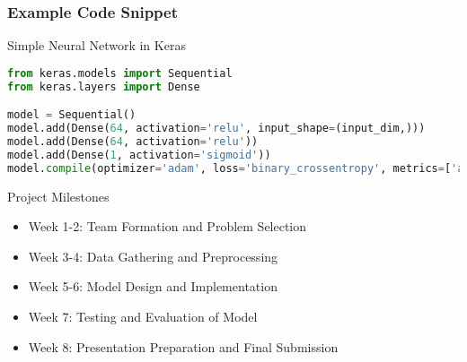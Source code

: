 \documentclass[aspectratio=169]{beamer}
\begin{document}
\begin{frame}[fragile]
    \frametitle{Example Code Snippet}

    \begin{block}{Simple Neural Network in Keras}
    \begin{lstlisting}[language=Python]
from keras.models import Sequential
from keras.layers import Dense

model = Sequential()
model.add(Dense(64, activation='relu', input_shape=(input_dim,)))
model.add(Dense(64, activation='relu'))
model.add(Dense(1, activation='sigmoid'))
model.compile(optimizer='adam', loss='binary_crossentropy', metrics=['accuracy'])
    \end{lstlisting}
    \end{block}
    
    \begin{block}{Project Milestones}
        \begin{itemize}
            \item Week 1-2: Team Formation and Problem Selection
            \item Week 3-4: Data Gathering and Preprocessing
            \item Week 5-6: Model Design and Implementation
            \item Week 7: Testing and Evaluation of Model
            \item Week 8: Presentation Preparation and Final Submission
        \end{itemize}
    \end{block}
\end{frame}
\end{document}
